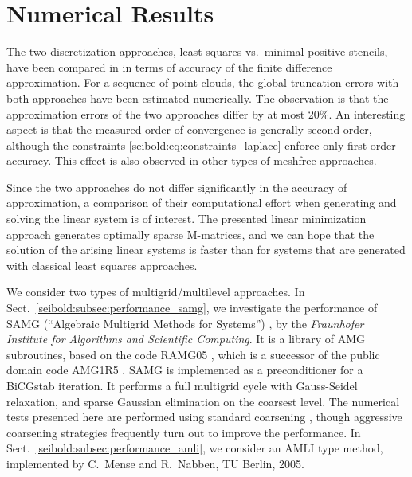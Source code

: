 \documentclass[reqno]{amsart}
\theoremstyle{plain}
\theoremstyle{definition}
\theoremstyle{remark}
\begin{document}
\section{Numerical Results}
\label{seibold:sec:numerics}
The two discretization approaches, least-squares vs.~minimal positive stencils, have
been compared in \cite{Seibold2008} in terms of accuracy of the finite difference
approximation. For a sequence of point clouds, the global truncation errors with both
approaches have been estimated numerically. The observation is that the approximation
errors of the two approaches differ by at most 20\%.
An interesting aspect is that the measured order of convergence is generally second
order, although the constraints \eqref{seibold:eq:constraints_laplace} enforce only
first order accuracy. This effect is also observed in other types of meshfree approaches.

Since the two approaches do not differ significantly in the accuracy of approximation,
a comparison of their computational effort when generating and solving the linear system
is of interest. The presented linear minimization approach generates optimally sparse
M-matrices, and we can hope that the solution of the arising linear systems is faster
than for systems that are generated with classical least squares approaches.

We consider two types of multigrid/multilevel approaches.
In Sect.~\ref{seibold:subsec:performance_samg}, we investigate the performance of
SAMG (``Algebraic Multigrid Methods for Systems'') \cite{SAMG}, by the
\emph{Fraunhofer Institute for Algorithms and Scientific Computing}.
It is a library of AMG subroutines, based on the code
RAMG05 \cite[App.~A]{TrottenbergOosterleeSchuller2001}, which is a successor of
the public domain code AMG1R5 \cite{RugeStueben1986}. SAMG is implemented as
a preconditioner for a BiCGstab \cite{VanDerVorst1992} iteration. It performs
a full multigrid cycle with Gauss-Seidel relaxation, and sparse Gaussian elimination
on the coarsest level. The numerical tests presented here are performed using
standard coarsening \cite[pp.~473]{TrottenbergOosterleeSchuller2001},
though aggressive coarsening strategies \cite[pp.~476]{TrottenbergOosterleeSchuller2001}
frequently turn out to improve the performance.
In Sect.~\ref{seibold:subsec:performance_amli}, we consider an AMLI type method,
implemented by C.~Mense and R.~Nabben, TU Berlin, 2005.
\end{document}
